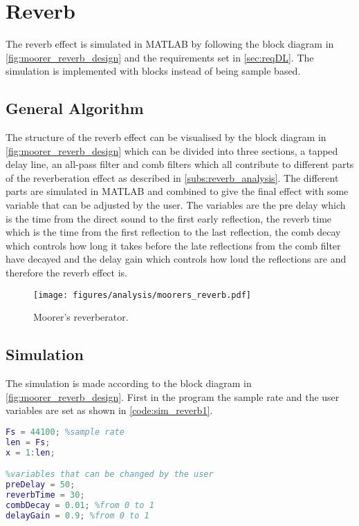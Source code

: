 \section{Reverb}
\label{sec:design_reverb}
The reverb effect is simulated in MATLAB by following the block diagram in \autoref{fig:moorer_reverb_design} and the requirements set in \autoref{sec:reqDL}. The simulation is implemented with blocks instead of being sample based.

\subsection{General Algorithm}
The structure of the reverb effect can be visualised by the block diagram in \autoref{fig:moorer_reverb_design} which can be divided into three sections, a tapped delay line, an all-pass filter and comb filters which all contribute to different parts of the reverberation effect as described in \autoref{subs:reverb_analysis}. The different parts are simulated in MATLAB and combined to give the final effect with some variable that can be adjusted by the user. The variables are the pre delay which is the time from the direct sound to the first early reflection, the reverb time which is the time from the first reflection to the last reflection, the comb decay which controls how long it takes before the late reflections from the comb filter have decayed and the delay gain which controls how loud the reflections are and therefore the reverb effect is.

\begin{figure}[htbp]
	\centering
	\texttt{[image: figures/analysis/moorers\_reverb.pdf]}
	\caption{Moorer’s reverberator.}
	\label{fig:moorer_reverb_design}
\end{figure}

\subsection{Simulation}

The simulation is made according to the block diagram in \autoref{fig:moorer_reverb_design}. First in the program the sample rate and the user variables are set as shown in \autoref{code:sim_reverb1}.


\begin{lstlisting}[caption={Sample rate and user variables.},language=MATLAB,label={code:sim_reverb1},tabsize=2]
Fs = 44100; %sample rate
len = Fs; 
x = 1:len;

%variables that can be changed by the user
preDelay = 50; 
reverbTime = 30;
combDecay = 0.01; %from 0 to 1
delayGain = 0.9; %from 0 to 1
\end{lstlisting}

